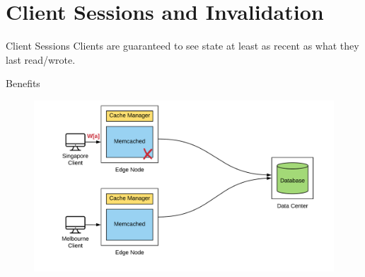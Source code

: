 \documentclass[10pt]{beamer}
\begin{document}

\section{Client Sessions and Invalidation}

\begin{frame}[fragile]{Client Sessions}
Clients are guaranteed to see state at least as recent as what they last read/wrote.
    \begin{itemize}
    \end{itemize}
\end{frame}

\begin{frame}{Benefits}
    \begin{figure}
        \center
        \hspace*{-1.5cm}
        \includegraphics[scale=0.17]{apollo_ec_upd}
    \end{figure}
\end{frame}
\end{document}
